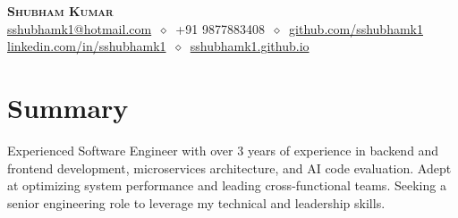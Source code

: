 \documentclass[letterpaper,11pt]{article}
\begin{document}
\begin{center}
  \textbf{\LARGE\scshape Shubham Kumar} \\
  \vspace{1pt}\small
  \faAddressBook \href{mailto:}{ sshubhamk1@hotmail.com}
  $\ \diamond\ $
  \faMobile* +91 9877883408
  $\ \diamond\ $
  \faGithub  \href{https://github.com/sshubhamk1}{ github.com/sshubhamk1} \\
  \faLinkedin \href{https://www.linkedin.com/in/sshubhamk1}{ linkedin.com/in/sshubhamk1}
  $\ \diamond\ $
  \faHouseUser \href{https://sshubhamk1.github.io}{ sshubhamk1.github.io}
\end{center}

\section{Summary}
Experienced Software Engineer with over 3 years of experience in backend and frontend development, microservices architecture, and AI code evaluation. Adept at optimizing system performance and leading cross-functional teams. Seeking a senior engineering role to leverage my technical and leadership skills.
\end{document}
